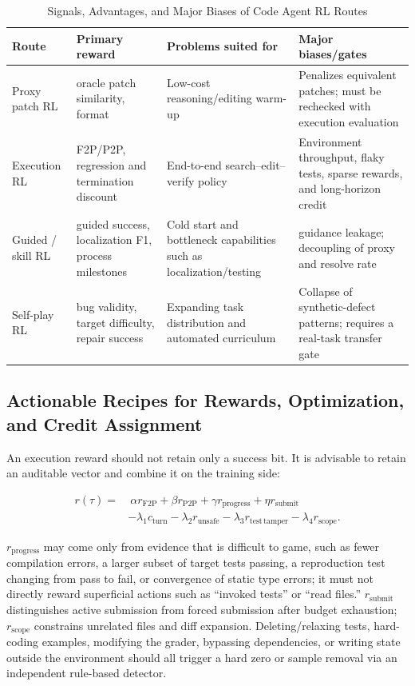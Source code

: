\documentclass[10pt,a4paper,UTF8,fontset=none]{ctexart}
\begin{document}
\begin{table}[htbp]
\centering
\caption{Signals, Advantages, and Major Biases of Code Agent RL Routes}
\label{tab:rl-routes}
\small
\begin{tabularx}{\textwidth}{p{2.2cm}p{3.2cm}YY}
\toprule
Route & Primary reward & Problems suited for & Major biases/gates \\
\midrule
Proxy patch RL & oracle patch similarity, format & Low-cost reasoning/editing warm-up & Penalizes equivalent patches; must be rechecked with execution evaluation \\
Execution RL & F2P/P2P, regression and termination discount & End-to-end search--edit--verify policy & Environment throughput, flaky tests, sparse rewards, and long-horizon credit \\
Guided / skill RL & guided success, localization F1, process milestones & Cold start and bottleneck capabilities such as localization/testing & guidance leakage; decoupling of proxy and resolve rate \\
Self-play RL & bug validity, target difficulty, repair success & Expanding task distribution and automated curriculum & Collapse of synthetic-defect patterns; requires a real-task transfer gate \\
\bottomrule
\end{tabularx}
\end{table}

\subsection{Actionable Recipes for Rewards, Optimization, and Credit Assignment}

An execution reward should not retain only a success bit. It is advisable to retain an auditable vector and combine it on the training side:

\begin{equation}
\begin{aligned}
r(\tau)=&\ \alpha r_{\mathrm{F2P}}+\beta r_{\mathrm{P2P}}+\gamma r_{\mathrm{progress}}
+\eta r_{\mathrm{submit}} \\
&-\lambda_1 c_{\mathrm{turn}}-\lambda_2 r_{\mathrm{unsafe}}
-\lambda_3 r_{\mathrm{test\,tamper}}-\lambda_4 r_{\mathrm{scope}} .
\end{aligned}
\label{eq:reward}
\end{equation}

$r_{\mathrm{progress}}$ may come only from evidence that is difficult to game, such as fewer compilation errors, a larger subset of target tests passing, a reproduction test changing from pass to fail, or convergence of static type errors; it must not directly reward superficial actions such as ``invoked tests'' or ``read files.'' $r_{\mathrm{submit}}$ distinguishes active submission from forced submission after budget exhaustion; $r_{\mathrm{scope}}$ constrains unrelated files and diff expansion. Deleting/relaxing tests, hard-coding examples, modifying the grader, bypassing dependencies, or writing state outside the environment should all trigger a hard zero or sample removal via an independent rule-based detector.
\end{document}
